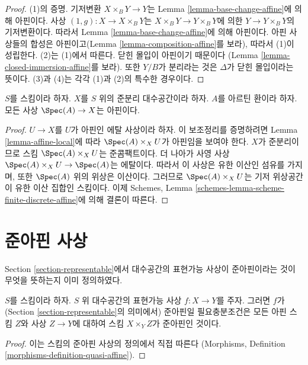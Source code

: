 \begin{proof}
(1)의 증명. 기저변환
$X \times_B Y \to Y$는 Lemma \ref{lemma-base-change-affine}에 의해
아핀이다. 사상
$(1, g) : X \to X \times_B Y$는
$X \times_B Y \to Y \times_B Y$에 의한
$Y \to Y \times_B Y$의 기저변환이다.
따라서 Lemma \ref{lemma-base-change-affine}에 의해 아핀이다.
아핀 사상들의 합성은 아핀이고(Lemma
\ref{lemma-composition-affine}를 보라), 따라서 (1)이 성립한다.
(2)는 (1)에서 따른다. 닫힌 몰입이 아핀이기 때문이다
(Lemma \ref{lemma-closed-immersion-affine}를 보라). 또한 $Y/B$가
분리라는 것은 $\Delta$가 닫힌 몰입이라는 뜻이다.
(3)과 (4)는 각각 (1)과 (2)의 특수한 경우이다.
\end{proof}

\begin{lemma}
\label{lemma-Artinian-affine}
$S$를 스킴이라 하자. $X$를 $S$ 위의 준분리 대수공간이라 하자.
$A$를 아르틴 환이라 하자. 모든 사상 $\Spec(A) \to X$는 아핀이다.
\end{lemma}

\begin{proof}
$U \to X$를 $U$가 아핀인 에탈 사상이라 하자. 이 보조정리를
증명하려면 Lemma \ref{lemma-affine-local}에 따라
$\Spec(A) \times_X U$가 아핀임을 보여야 한다. $X$가 준분리이므로
스킴 $\Spec(A) \times_X U$는 준콤팩트이다. 더 나아가 사영 사상
$\Spec(A) \times_X U \to \Spec(A)$는 에탈이다.
따라서 이 사상은 유한 이산인 섬유를 가지며, 또한
$\Spec(A)$ 위의 위상은 이산이다. 그러므로
$\Spec(A) \times_X U$는 기저 위상공간이 유한 이산 집합인
스킴이다. 이제 Schemes, Lemma
\ref{schemes-lemma-scheme-finite-discrete-affine}에 의해 결론이 따른다.
\end{proof}

\section{준아핀 사상}
\label{section-quasi-affine}

\noindent
Section \ref{section-representable}에서 대수공간의 표현가능 사상이
준아핀이라는 것이 무엇을 뜻하는지 이미 정의하였다.

\begin{lemma}
\label{lemma-quasi-affine-representable}
$S$를 스킴이라 하자. $S$ 위 대수공간의 표현가능 사상
$f : X \to Y$를 주자. 그러면
$f$가 (Section \ref{section-representable}의 의미에서) 준아핀일
필요충분조건은 모든 아핀 스킴 $Z$와 사상 $Z \to Y$에 대하여
스킴 $X \times_Y Z$가 준아핀인 것이다.
\end{lemma}

\begin{proof}
이는 스킴의 준아핀 사상의 정의에서 직접 따른다
(Morphisms, Definition \ref{morphisms-definition-quasi-affine}).
\end{proof}

